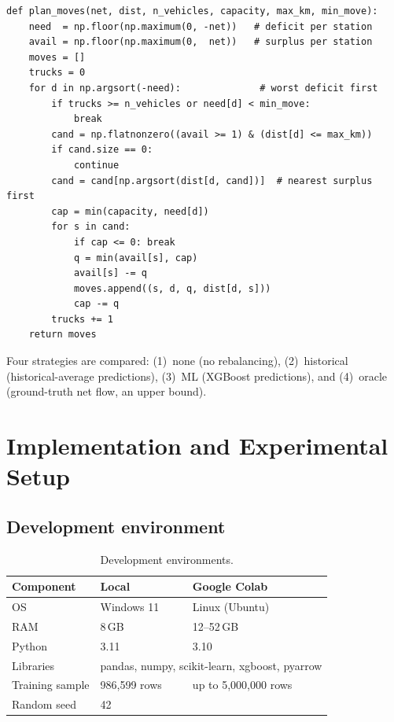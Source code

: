 \documentclass[12pt,a4paper]{report}
\begin{document}
\begin{lstlisting}[caption={Greedy surplus-to-deficit matching
(\texttt{rebalance.py})},label={lst:rebalance}]
def plan_moves(net, dist, n_vehicles, capacity, max_km, min_move):
    need  = np.floor(np.maximum(0, -net))   # deficit per station
    avail = np.floor(np.maximum(0,  net))   # surplus per station
    moves = []
    trucks = 0
    for d in np.argsort(-need):              # worst deficit first
        if trucks >= n_vehicles or need[d] < min_move:
            break
        cand = np.flatnonzero((avail >= 1) & (dist[d] <= max_km))
        if cand.size == 0:
            continue
        cand = cand[np.argsort(dist[d, cand])]  # nearest surplus first
        cap = min(capacity, need[d])
        for s in cand:
            if cap <= 0: break
            q = min(avail[s], cap)
            avail[s] -= q
            moves.append((s, d, q, dist[d, s]))
            cap -= q
        trucks += 1
    return moves
\end{lstlisting}

Four strategies are compared: (1)~none (no rebalancing),
(2)~historical (historical-average predictions), (3)~ML (XGBoost
predictions), and (4)~oracle (ground-truth net flow, an upper bound).

\chapter{Implementation and Experimental Setup}

\section{Development environment}

\begin{table}[H]
\centering
\caption{Development environments.}
\label{tab:env}
\small
\begin{tabular}{@{}lll@{}}
\toprule
\textbf{Component} & \textbf{Local} & \textbf{Google Colab} \\
\midrule
OS & Windows 11 & Linux (Ubuntu) \\
RAM & 8\,GB & 12--52\,GB \\
Python & 3.11 & 3.10 \\
Libraries & \multicolumn{2}{l}{pandas, numpy, scikit-learn, xgboost, pyarrow} \\
Training sample & 986{,}599 rows & up to 5{,}000{,}000 rows \\
Random seed & \multicolumn{2}{l}{42} \\
\bottomrule
\end{tabular}
\end{table}
\end{document}
